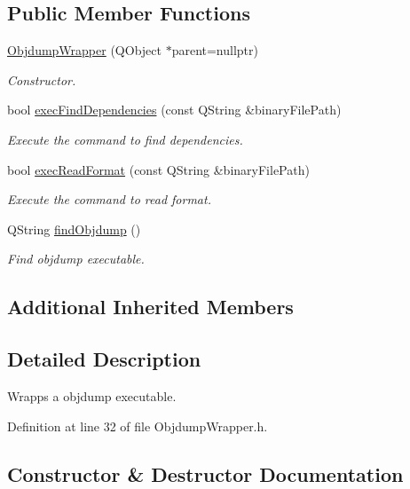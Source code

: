 \subsection*{Public Member Functions}
\begin{DoxyCompactItemize}
\item 
\hyperlink{class_mdt_1_1_deploy_utils_1_1_objdump_wrapper_a6f042e9d1554f14fcc320c2efef16ffa}{Objdump\+Wrapper} (Q\+Object $\ast$parent=nullptr)
\begin{DoxyCompactList}\small\item\em Constructor. \end{DoxyCompactList}\item 
bool \hyperlink{class_mdt_1_1_deploy_utils_1_1_objdump_wrapper_ab97db66a2a9ad2db9932a7c833c11cd1}{exec\+Find\+Dependencies} (const Q\+String \&binary\+File\+Path)
\begin{DoxyCompactList}\small\item\em Execute the command to find dependencies. \end{DoxyCompactList}\item 
bool \hyperlink{class_mdt_1_1_deploy_utils_1_1_objdump_wrapper_a38237494f7027dec851514c7f7179278}{exec\+Read\+Format} (const Q\+String \&binary\+File\+Path)
\begin{DoxyCompactList}\small\item\em Execute the command to read format. \end{DoxyCompactList}\item 
Q\+String \hyperlink{class_mdt_1_1_deploy_utils_1_1_objdump_wrapper_a515708420d15527141d19c365d3f1bd6}{find\+Objdump} ()
\begin{DoxyCompactList}\small\item\em Find objdump executable. \end{DoxyCompactList}\end{DoxyCompactItemize}
\subsection*{Additional Inherited Members}


\subsection{Detailed Description}
Wrapps a objdump executable. 

Definition at line 32 of file Objdump\+Wrapper.\+h.



\subsection{Constructor \& Destructor Documentation}
